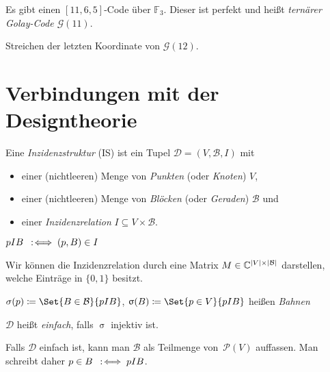 \documentclass{cheat-sheet}
\newcommand{\F}{\mathbb{F}} %
\newcommand{\Golay}{\mathcal{G}} %
\newcommand{\Design}{\mathcal{D}} %
\newcommand{\Blocks}{\mathcal{B}} %
\newcommand{\Pow}{\mathcal{P}} %
\begin{document}

\begin{satz}
  Es gibt einen $[11, 6, 5]$-Code über $\F_3$. Dieser ist perfekt und heißt \emph{ternärer Golay-Code $\Golay(11)$}.
\end{satz}

\begin{konstr}
  Streichen der letzten Koordinate von $\Golay(12)$.
\end{konstr}

\section{Verbindungen mit der Designtheorie}

\begin{defn}
  Eine \emph{Inzidenzstruktur} (IS) ist ein Tupel $\Design = (V, \Blocks, I)$ mit
  \begin{itemize}
    \item einer (nichtleeren) Menge von \emph{Punkten} (oder \textit{Knoten}) $V$,
    \item einer (nichtleeren) Menge von \emph{Blöcken} (oder \textit{Geraden}) $\Blocks$ und
    \item einer \emph{Inzidenzrelation} $I \subseteq V \times \Blocks$.
  \end{itemize}
\end{defn}

\begin{nota}
  $p I B \enspace:\!\iff (p, B) \in I$
\end{nota}

\begin{bem}
  Wir können die Inzidenzrelation durch eine Matrix $M \in \C^{\abs{V} \times \abs{\Blocks}}$ darstellen, welche Einträge in $\{ 0, 1 \}$ besitzt.
\end{bem}

\begin{defn}
  $\sigma(p) \coloneqq \Set{B \in \Blocks}{p I B}$,
  $\upsigma(B) \coloneqq \Set{p \in V}{p I B}$ \enspace
  heißen \emph{Bahnen}
\end{defn}

\begin{defn}
  $\Design$ heißt \emph{einfach}, falls $\upsigma$ injektiv ist.
\end{defn}

\begin{nota}
  Falls $\Design$ einfach ist, kann man $\Blocks$ als Teilmenge von~$\Pow(V)$ auffassen. Man schreibt daher
  $p \in B \enspace:\!\iff p I B$.
\end{nota}
\end{document}
